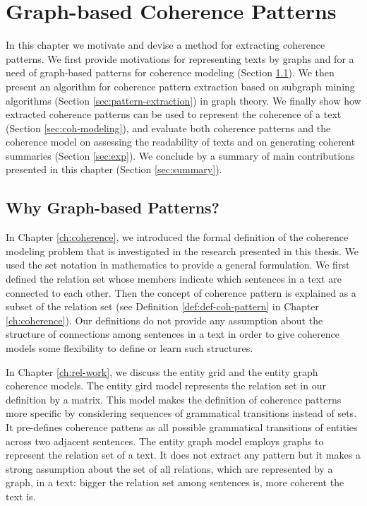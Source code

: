 
\chapter{Graph-based Coherence Patterns}
\label{ch:coh-patterns}

In this chapter we motivate and devise a method for extracting coherence patterns.  
We first provide motivations for representing texts by graphs and for a need of graph-based patterns for coherence modeling (Section \ref{sec:motivation}).  
We then present an algorithm for coherence pattern extraction based on subgraph mining algorithms (Section \ref{sec:pattern-extraction}) in graph theory.  
We finally show how extracted coherence patterns can be used to represent the coherence of a text (Section \ref{sec:coh-modeling}), and evaluate both coherence patterns and the coherence model on assessing the readability of texts and on generating coherent summaries (Section \ref{sec:exp}). 
We conclude by a summary of main contributions presented in this chapter (Section \ref{sec:summary}). 

\section{Why Graph-based Patterns?}
\label{sec:motivation}

In Chapter \ref{ch:coherence}, we introduced the formal definition of the coherence modeling problem that is investigated in the research presented in this thesis. 
We used the set notation in mathematics to provide a general formulation. 
We first defined the relation set whose members indicate which sentences in a text are connected to each other. 
Then the concept of coherence pattern is explained as a subset of the relation set (see Definition \ref{def:def-coh-pattern} in Chapter \ref{ch:coherence}). 
Our definitions do not provide any assumption about the structure of connections among sentences in a text in order to give coherence models some flexibility to define or learn such structures. 

In Chapter \ref{ch:rel-work}, we discuss the entity grid 
\cite{barzilay05a,barzilay08} and the entity graph 
\cite{guinaudeau13} coherence models. 
The entity gird model represents the relation set in our definition by a matrix. 
This model makes the definition of coherence patterns more specific by considering sequences of grammatical transitions instead of sets.  
It pre-defines coherence pattens as all possible grammatical transitions of entities across two adjacent sentences. 
The entity graph model employs graphs to represent the relation set of a text.  
It does not extract any pattern but it makes a strong assumption about the set of all relations, which are represented by a graph, in a text:
bigger the relation set among sentences is, more coherent the text is. 

